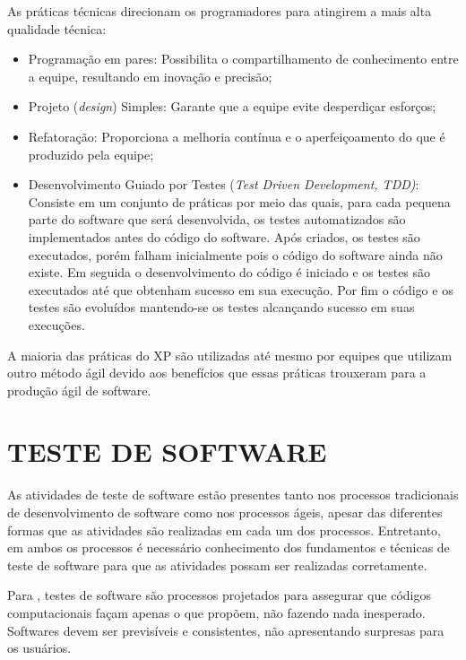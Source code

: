             As práticas técnicas direcionam os programadores para atingirem a mais alta qualidade técnica\cite{Martin2020}:
            \begin{itemize}
                \item Programação em pares: Possibilita o compartilhamento de conhecimento entre a equipe, resultando em inovação e precisão;
                \item Projeto (\emph{design}) Simples: Garante que a equipe evite desperdiçar esforços;
                \item Refatoração: Proporciona a melhoria contínua e o aperfeiçoamento do que é produzido pela equipe;
                \item Desenvolvimento Guiado por Testes (\emph{Test Driven Development, TDD)}: Consiste em um conjunto de práticas por meio das quais, para cada pequena parte do software que será desenvolvida, os testes automatizados são implementados antes do código do software. Após criados, os testes são executados, porém falham inicialmente pois o código do software ainda não existe. Em seguida o desenvolvimento do código é iniciado e os testes são executados até que obtenham sucesso em sua execução. Por fim o código e os testes são evoluídos mantendo-se os testes alcançando sucesso em suas execuções.
            \end{itemize}
            
            A maioria das práticas do XP são utilizadas até mesmo por equipes que utilizam outro método ágil devido aos benefícios que essas práticas trouxeram para a produção ágil de software.


\chapter{TESTE DE SOFTWARE}
\label{chap:teste-de-software}

As atividades de teste de software estão presentes tanto nos processos tradicionais de desenvolvimento de software como nos processos ágeis, apesar das diferentes formas que as atividades são realizadas em cada um dos processos. Entretanto, em ambos os processos é necessário conhecimento dos fundamentos e técnicas de teste de software para que as atividades possam ser realizadas corretamente.

Para , testes de software são processos projetados para assegurar que códigos computacionais façam apenas o que propõem, não fazendo nada inesperado. Softwares devem ser previsíveis e consistentes, não apresentando surpresas para os usuários.

